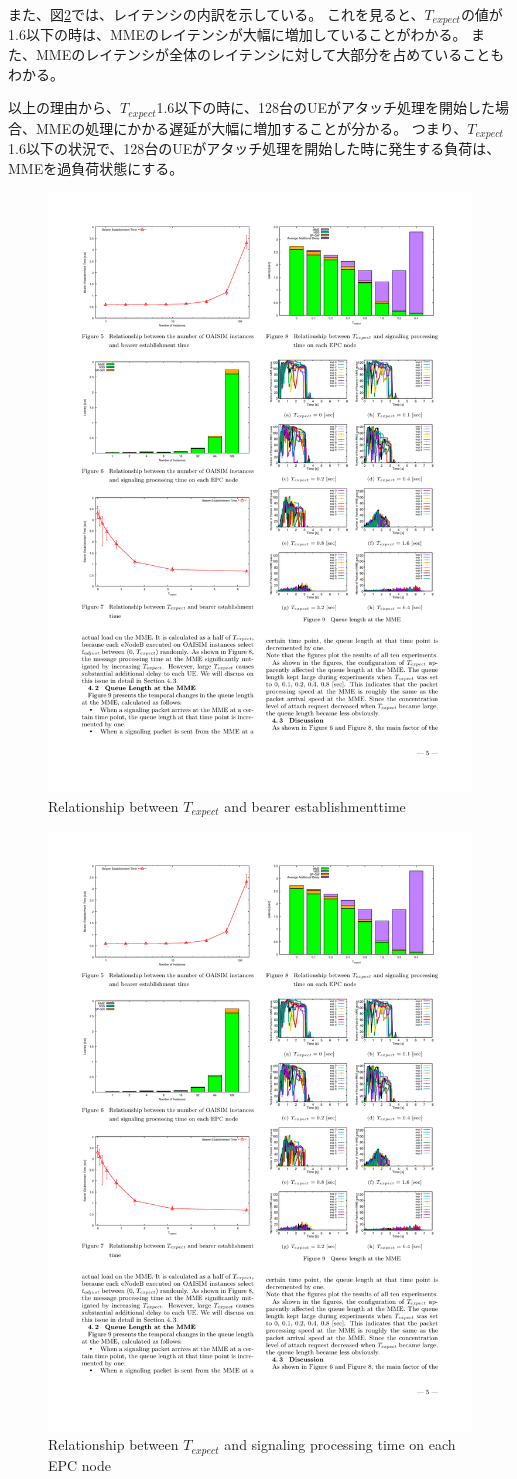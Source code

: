 \documentclass[a4j]{ujarticle}
\begin{document}
また、図\ref{Latency_node_ueno}では、レイテンシの内訳を示している。
これを見ると、$T_{expect}$の値が1.6以下の時は、MMEのレイテンシが大幅に増加していることがわかる。
また、MMEのレイテンシが全体のレイテンシに対して大部分を占めていることもわかる。

以上の理由から、$T_{expect}$1.6以下の時に、128台のUEがアタッチ処理を開始した場合、MMEの処理にかかる遅延が大幅に増加することが分かる。
つまり、$T_{expect}$1.6以下の状況で、128台のUEがアタッチ処理を開始した時に発生する負荷は、MMEを過負荷状態にする。



\begin{figure}[htbp]
  \centering
  \includegraphics[width=0.6\hsize]{t_expect_ueno.pdf}
  \caption{Relationship between $T_{expect}$ and bearer establishmenttime}
  \label{t_expect_ueno}
\end{figure}

\begin{figure}[htbp]
  \centering
  \includegraphics[width=0.6\hsize]{Latency_node_ueno.pdf}
  \caption{Relationship between $T_{expect}$ and signaling processing time on each EPC node}
  \label{Latency_node_ueno}
\end{figure}
\end{document}
